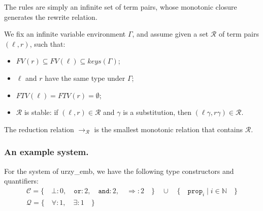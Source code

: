 \documentclass[runningheads,a4paper]{llncs}
\newcommand{\Rules}{\mathcal{R}}
\newcommand{\TypeConstructors}{\mathcal{C}}
\newcommand{\TypeQuantifiers}{\mathcal{Q}}
\newcommand{\arr}[1]{\to_{#1}}
\newcommand{\FTV}{\mathit{FTV}}
\newcommand{\FV}{\mathit{FV}}
\begin{document}
The rules are simply an infinite set of term pairs, whose monotonic
closure generates the rewrite relation.

\begin{definition}
We fix an infinite variable environment $\Gamma$,
and assume given a set $\Rules$ of term pairs $(\ell,r)$, such that:
\begin{itemize}
\item $\FV(r) \subseteq \FV(\ell) \subseteq \mathit{keys}(\Gamma)$;
\item $\ell$ and $r$ have the same type under $\Gamma$;
\item $\FTV(\ell) = \FTV(r) = \emptyset$;
\item $\Rules$ is stable: if $(\ell,r) \in \Rules$ and $\gamma$ is a
  substitution, then $(\ell\gamma,r\gamma) \in \Rules$.
\end{itemize}
The reduction relation $\arr{\Rules}$ is the smallest monotonic
relation that contains $\Rules$.
\end{definition}

\subsubsection{An example system.}

For the system of urzy\_emb, we have the following type constructors
and quantifiers:
\[
\begin{array}{c}
\TypeConstructors = \{\quad
  \bot : 0,\quad
  \mathtt{or} : 2,\quad
  \mathtt{and} : 2,\quad
  \Rightarrow : 2\quad
  \}\quad \cup\quad
  \{\quad \mathtt{prop}_i \mid i \in \mathbb{N}\quad \} \\
\TypeQuantifiers = \{\quad
  \forall : 1,\quad
  \exists : 1\quad
  \} \\
\end{array}
\]
\end{document}
